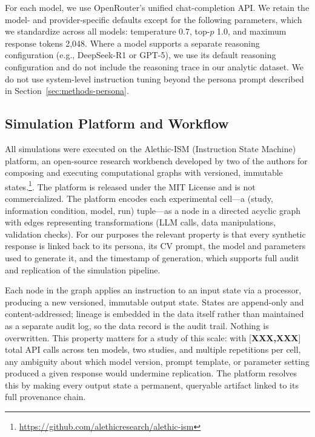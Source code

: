 \documentclass[12pt]{article}
\begin{document}


For each model, we use OpenRouter's unified chat-completion API. We retain
the model- and provider-specific defaults except for the following
parameters, which we standardize across all models: temperature 0.7,
top-$p$ 1.0, and maximum response tokens 2{,}048. Where a model supports
a separate reasoning configuration (e.g., DeepSeek-R1 or GPT-5), we use
its default reasoning configuration and do not include the reasoning trace
in our analytic dataset. We do not use system-level instruction tuning
beyond the persona prompt described in
Section~\ref{sec:methods-persona}.

\subsection{Simulation Platform and Workflow}\label{sec:methods-platform}

All simulations were executed on the Alethic-ISM (Instruction State Machine) platform, an open-source research workbench developed by two of the authors for composing and executing computational graphs with versioned, immutable states.\footnote{\url{https://github.com/alethicresearch/alethic-ism}}. The platform is released under the MIT License and is not commercialized.
The platform encodes each experimental cell---a (study, information
condition, model, run) tuple---as a node in a directed acyclic graph with
edges representing transformations (LLM calls, data manipulations,
validation checks). For our purposes the relevant property is that every
synthetic response is linked back to its persona, its CV prompt, the
model and parameters used to generate it, and the timestamp of generation,
which supports full audit and replication of the simulation pipeline.

Each node in the graph applies an instruction to an input state via a
processor, producing a new versioned, immutable output state. States are
append-only and content-addressed; lineage is embedded in the data itself
rather than maintained as a separate audit log, so the data record is the
audit trail. Nothing is overwritten. This property matters for a study of
this scale: with [\textbf{XXX,XXX}] total API calls across ten models, two
studies, and multiple repetitions per cell, any ambiguity about which model
version, prompt template, or parameter setting produced a given response
would undermine replication. The platform resolves this by making every
output state a permanent, queryable artifact linked to its full provenance
chain.
\end{document}
